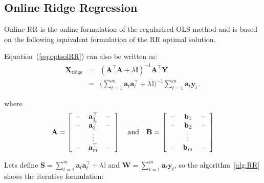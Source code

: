 \documentclass[twocolumn]{svjour3}          %
\begin{document}
\subsection{Online Ridge Regression}

Online RR is the online formulation of the regularised OLS method
and is based on the following equivalent formulation of the RR optimal solution.

Equation~(\ref{eq:optsolRR}) can also be written as:
\begin{eqnarray*}
\label{eq:RReapand}
\mathbf{\mathbf{X}}_{\text{ridge}}&=&(\mathbf{A}^\top \mathbf{A}+ \lambda
\mathbb{I})^{-1}\mathbf{A}^\top \mathbf{Y} \\
&=& \displaystyle \big (\sum_{t=1}^m
\mathbf{a}_t \mathbf{a}_t  ^\top + \lambda \mathbb{I}\big )^{-1}
\sum_{t=1}^m \mathbf{a}_t \mathbf{y}_t \, .
\end{eqnarray*}

\noindent where 
\begin{equation}
\label{eq:notation}
	\mathbf{A} = 
\left[
  \begin{tabular}{c>{$}c<{$}c}
    -- & \mathbf{a}^{\top}_{1} & --\\
    -- & \mathbf{a}^{\top}_{2} & --\\
    & \vdots & \\
    -- & \mathbf{a}^{\top}_{m} & --
  \end{tabular}
\right]
\quad \text{and} \quad
\mathbf{B} =
\left[
  \begin{tabular}{c>{$}c<{$}c}
    -- & \mathbf{b}_{1} & --\\
    -- & \mathbf{b}_{2} & --\\
    & \vdots & \\
    -- & \mathbf{b}_{m} & --
  \end{tabular}
\right]
\end{equation}


Lets define $\displaystyle\mathbf{S}= \sum_{t=1}^m \mathbf{a}_t
\mathbf{a}_t  ^\top + \lambda \mathbb{I} $ and $\mathbf{W}=
\displaystyle\sum_{t=1}^m \mathbf{a}_t \mathbf{y}_t$, so the
algorithm~\ref{alg:RR} shows the iterative formulation:
\end{document}

